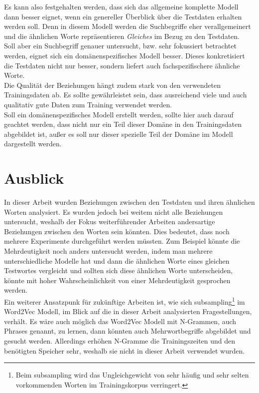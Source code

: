 \documentclass[12pt,a4paper]{report}
\begin{document}
Es kann also festgehalten werden, dass sich das allgemeine komplette Modell dann besser eignet, wenn ein genereller Überblick über die Testdaten erhalten werden soll. Denn in diesem Modell werden die Suchbegriffe eher verallgemeinert und die ähnlichen Worte repräsentieren \textit{Gleiches} im Bezug zu den Testdaten.\\
Soll aber ein Suchbegriff genauer untersucht, bzw. sehr fokussiert betrachtet werden, eignet sich ein domänenspezifisches Modell besser. Dieses konkretisiert die Testdaten nicht nur besser, sondern liefert auch fachspezifischere ähnliche Worte.\\

Die Qualität der Beziehungen hängt zudem stark von den verwendeten Trainingsdaten ab. Es sollte gewährleistet sein, dass ausreichend viele und auch qualitativ gute Daten zum Training verwendet werden.\\
Soll ein domänenspezifisches Modell erstellt werden, sollte hier auch darauf geachtet werden, dass nicht nur ein Teil dieser Domäne in den Trainingsdaten abgebildet ist, außer es soll nur dieser spezielle Teil der Domäne im Modell dargestellt werden.\\


\section{Ausblick}

In dieser Arbeit wurden Beziehungen zwischen den Testdaten und ihren ähnlichen Worten analysiert. Es wurden jedoch bei weitem nicht alle Beziehungen untersucht, weshalb der Fokus weiterführender Arbeiten andersartige Beziehungen zwischen den Worten sein könnten. Dies bedeutet, dass noch mehrere Experimente durchgeführt werden müssten. Zum Beispiel könnte die Mehrdeutigkeit noch anders untersucht werden, indem man mehrere unterschiedliche Modelle hat und dann die ähnlichen Worte eines gleichen Testwortes vergleicht und sollten sich diese ähnlichen Worte unterscheiden, könnte mit hoher Wahrscheinlichkeit von einer Mehrdeutigkeit gesprochen werden.\\
Ein weiterer Ansatzpunk  für zukünftige Arbeiten ist, wie sich subsampling\footnote{Beim subsampling wird das Ungleichgewicht von sehr häufig und sehr selten vorkommenden Worten im Trainingskorpus verringert\citep{DBLP:journals/corr/MikolovSCCD13}. } im Word2Vec Modell, im Blick auf die in dieser Arbeit analysierten Fragestellungen, verhält. Es wäre auch möglich das Word2Vec Modell mit N-Grammen, auch Phrases genannt, zu lernen, dann könnten auch Mehrwortbegriffe abgebildet und gesucht werden. Allerdings erhöhen N-Gramme die Trainingszeiten und den benötigten Speicher sehr\citep{DBLP:journals/corr/MikolovSCCD13}, weshalb sie nicht in dieser Arbeit verwendet wurden.
\end{document}
